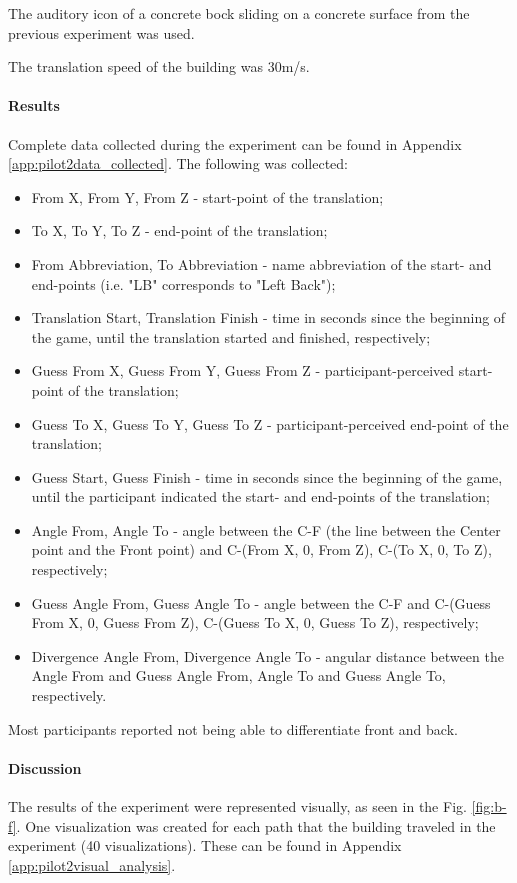 The auditory icon of a concrete bock sliding on a concrete surface from the previous experiment was used. 

The translation speed of the building was 30m/s.

\paragraph{Results}
Complete data collected during the experiment can be found in Appendix \ref{app:pilot2data_collected}.
The following was collected:
\begin{itemize}
	\item From X, From Y, From Z - start-point of the translation;
	\item To X, To Y, To Z - end-point of the translation;
	\item From Abbreviation, To Abbreviation - name abbreviation of the start- and end-points (i.e. "LB" corresponds to "Left Back");
	\item Translation Start, Translation Finish - time in seconds since the beginning of the game, until the translation started and finished, respectively;
	\item Guess From X, Guess From Y, Guess From Z - participant-perceived start-point of the translation;
	\item Guess To X, Guess To Y, Guess To Z - participant-perceived end-point of the translation;
	\item Guess Start, Guess Finish - time in seconds since the beginning of the game, until the participant indicated the start- and end-points of the translation;
	\item Angle From, Angle To - angle between the C-F (the line between the Center point and the Front point) and C-(From X, 0, From Z), C-(To X, 0, To Z), respectively;
	\item Guess Angle From, Guess Angle To - angle between the C-F and C-(Guess From X, 0, Guess From Z), C-(Guess To X, 0, Guess To Z), respectively;
	\item Divergence Angle From, Divergence Angle To - angular distance between the Angle From and Guess Angle From, Angle To and Guess Angle To, respectively.
\end{itemize}

Most participants reported not being able to differentiate front and back.

\paragraph{Discussion}
The results of the experiment were represented visually, as seen in the Fig. \ref{fig:b-f}. One visualization was created for each path that the building traveled in the experiment (40 visualizations). These can be found in Appendix \ref{app:pilot2visual_analysis}.


